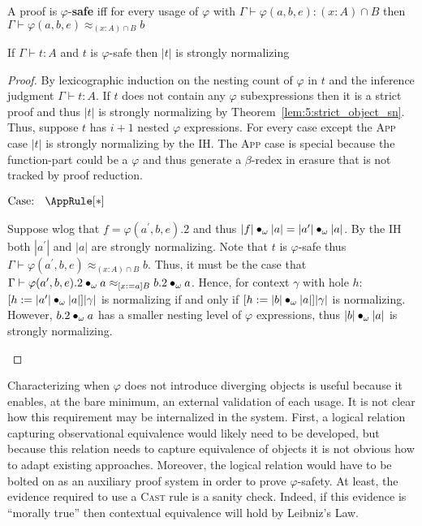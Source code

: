 \begin{definition}
    A proof is $\varphi$-\textbf{safe} iff for every usage of $\varphi$ with $\Gamma \vdash \varphi(a, b, e) : (x : A) \cap B$ then $\Gamma \vdash \varphi(a, b, e) \approx_{(x : A) \cap B} b$
\end{definition}

\begin{theorem}
    If $\Gamma \vdash t : A$ and $t$ is $\varphi$-safe then $|t|$ is strongly normalizing
\end{theorem}
\begin{proof}
    By lexicographic induction on the nesting count of $\varphi$ in $t$ and the inference judgment $\Gamma \vdash t : A$.
    If $t$ does not contain any $\varphi$ subexpressions then it is a strict proof and thus $|t|$ is strongly normalizing by Theorem~\ref{lem:5:strict_object_sn}.
    Thus, suppose $t$ has $i + 1$ nested $\varphi$ expressions.
    For every case except the \textsc{App} case $|t|$ is strongly normalizing by the IH.
    The \textsc{App} case is special because the function-part could be a $\varphi$ and thus generate a $\beta$-redex in erasure that is not tracked by proof reduction.

    $\text{Case: }\begin{array}{c} \AppRule[*] \end{array}$
    \begin{proofcase}
        Suppose wlog that $f = \varphi(a^\prime, b, e).2$ and thus $|f| \bullet_{\omega} |a| = |a^\prime| \bullet_{\omega} |a|$.
        By the IH both $|a^\prime|$ and $|a|$ are strongly normalizing.
        Note that $t$ is $\varphi$-safe thus $\Gamma \vdash \varphi(a^\prime, b, e) \approx_{(x : A) \cap B} b$.
        Thus, it must be the case that $\Gamma \vdash \varphi(a^\prime, b, e).2 \bullet_{\omega} a \approx_{[x := a]B} b.2 \bullet_{\omega} a$.
        Hence, for context $\gamma$ with hole $h$: $[h := |a^\prime| \bullet_{\omega} |a|]|\gamma|$ is normalizing if and only if $[h := |b| \bullet_{\omega} |a|]|\gamma|$ is normalizing.
        However, $b.2 \bullet_{\omega} a$ has a smaller nesting level of $\varphi$ expressions, thus $|b| \bullet_{\omega} |a|$ is strongly normalizing.
    \end{proofcase}
\end{proof}

Characterizing when $\varphi$ does not introduce diverging objects is useful because it enables, at the bare minimum, an external validation of each usage.
It is not clear how this requirement may be internalized in the system.
First, a logical relation capturing observational equivalence would likely need to be developed, but because this relation needs to capture equivalence of objects it is not obvious how to adapt existing approaches.
Moreover, the logical relation would have to be bolted on as an auxiliary proof system in order to prove $\varphi$-safety.
At least, the evidence required to use a \textsc{Cast} rule is a sanity check.
Indeed, if this evidence is ``morally true'' then contextual equivalence will hold by Leibniz's Law.

